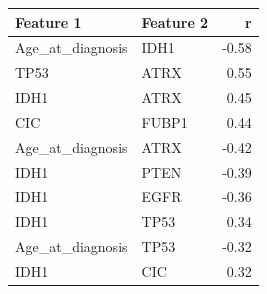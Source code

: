 \begin{tabular}{llr}
\toprule
\textbf{Feature 1} & \textbf{Feature 2} & \textbf{r} \\
\midrule
Age\_at\_diagnosis & IDH1 & -0.58 \\
TP53 & ATRX & 0.55 \\
IDH1 & ATRX & 0.45 \\
CIC & FUBP1 & 0.44 \\
Age\_at\_diagnosis & ATRX & -0.42 \\
IDH1 & PTEN & -0.39 \\
IDH1 & EGFR & -0.36 \\
IDH1 & TP53 & 0.34 \\
Age\_at\_diagnosis & TP53 & -0.32 \\
IDH1 & CIC & 0.32 \\
\bottomrule
\end{tabular}
